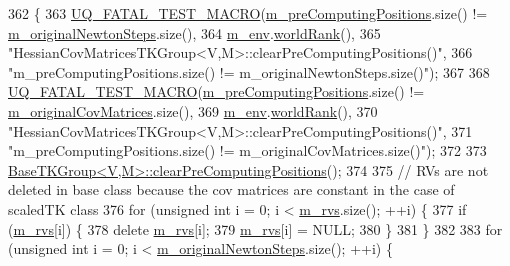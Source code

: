\begin{DoxyCode}
362 \{
363   \hyperlink{_defines_8h_a56d63d18d0a6d45757de47fcc06f574d}{UQ\_FATAL\_TEST\_MACRO}(\hyperlink{class_q_u_e_s_o_1_1_base_t_k_group_a93d7fe55e30a7c6f209b01cb8a67e322}{m\_preComputingPositions}.size() != 
      \hyperlink{class_q_u_e_s_o_1_1_hessian_cov_matrices_t_k_group_a4c0fe3171a35cdd453a4e23e1438ddf9}{m\_originalNewtonSteps}.size(),
364                       \hyperlink{class_q_u_e_s_o_1_1_base_t_k_group_a2bce5e8aa5c844d4332a0e73cf00a1f9}{m\_env}.\hyperlink{class_q_u_e_s_o_1_1_base_environment_a78b57112bbd0e6dd0e8afec00b40ffa7}{worldRank}(),
365                       \textcolor{stringliteral}{"HessianCovMatricesTKGroup<V,M>::clearPreComputingPositions()"},
366                       \textcolor{stringliteral}{"m\_preComputingPositions.size() != m\_originalNewtonSteps.size()"});
367 
368   \hyperlink{_defines_8h_a56d63d18d0a6d45757de47fcc06f574d}{UQ\_FATAL\_TEST\_MACRO}(\hyperlink{class_q_u_e_s_o_1_1_base_t_k_group_a93d7fe55e30a7c6f209b01cb8a67e322}{m\_preComputingPositions}.size() != 
      \hyperlink{class_q_u_e_s_o_1_1_hessian_cov_matrices_t_k_group_acc7219917faf933e77694894856fa646}{m\_originalCovMatrices}.size(),
369                       \hyperlink{class_q_u_e_s_o_1_1_base_t_k_group_a2bce5e8aa5c844d4332a0e73cf00a1f9}{m\_env}.\hyperlink{class_q_u_e_s_o_1_1_base_environment_a78b57112bbd0e6dd0e8afec00b40ffa7}{worldRank}(),
370                       \textcolor{stringliteral}{"HessianCovMatricesTKGroup<V,M>::clearPreComputingPositions()"},
371                       \textcolor{stringliteral}{"m\_preComputingPositions.size() != m\_originalCovMatrices.size()"});
372 
373   \hyperlink{class_q_u_e_s_o_1_1_base_t_k_group_adb4decb4e8f01dce2ae4d5a3333c74f8}{BaseTKGroup<V,M>::clearPreComputingPositions}();
374 
375   \textcolor{comment}{// RVs are not deleted in base class because the cov matrices are constant in the case of scaledTK class}
376   \textcolor{keywordflow}{for} (\textcolor{keywordtype}{unsigned} \textcolor{keywordtype}{int} i = 0; i < \hyperlink{class_q_u_e_s_o_1_1_base_t_k_group_a87c6b02ea45ab3de634c22afa58f53a5}{m\_rvs}.size(); ++i) \{
377     \textcolor{keywordflow}{if} (\hyperlink{class_q_u_e_s_o_1_1_base_t_k_group_a87c6b02ea45ab3de634c22afa58f53a5}{m\_rvs}[i]) \{
378       \textcolor{keyword}{delete} \hyperlink{class_q_u_e_s_o_1_1_base_t_k_group_a87c6b02ea45ab3de634c22afa58f53a5}{m\_rvs}[i];
379       \hyperlink{class_q_u_e_s_o_1_1_base_t_k_group_a87c6b02ea45ab3de634c22afa58f53a5}{m\_rvs}[i] = NULL;
380     \}
381   \}
382 
383   \textcolor{keywordflow}{for} (\textcolor{keywordtype}{unsigned} \textcolor{keywordtype}{int} i = 0; i < \hyperlink{class_q_u_e_s_o_1_1_hessian_cov_matrices_t_k_group_a4c0fe3171a35cdd453a4e23e1438ddf9}{m\_originalNewtonSteps}.size(); ++i) \{

\end{DoxyCode}
